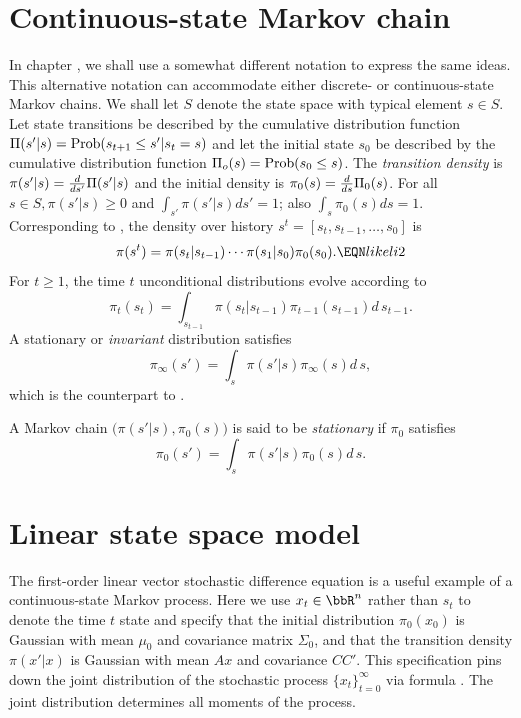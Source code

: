 \section{Continuous-state Markov chain}\label{sec:Markovcontstsp}%
In chapter , we shall  use a somewhat different
notation to express the same ideas. This alternative notation can
accommodate either discrete- or continuous-state Markov chains.  We
shall let $S$ denote the state space with typical element $s \in
S$.     Let state transitions be described by the cumulative distribution function
$\Pi(s' | s) =  {\rm
Prob} (s_{t+1} \leq  s' | s_t =s)$ and let the initial state $s_0$ be described by
 the cumulative distribution function $\Pi_o(s) =  {\rm
Prob} (s_0 \leq s)$.  The {\it transition density\/} is $\pi(s' | s )  =  {d \over d s'} \Pi(s'|s)$
and the initial density is %
$\pi_0(s) = {d \over d s} \Pi_0(s)$.  For all $s\in S, \pi(s'|s )
\geq 0$ and $  \int_{s'} \pi(s'|s) d s' =1$; also $\int_s \pi_0(s) d s
=1$.
Corresponding to , the  density
over  history $s^t = [s_t, s_{t-1}, \ldots, s_0]$
is
 $$ \pi(s^t) = \pi(s_t | s_{t-1} )\cdots \pi(s_1| s_0) \pi_0 (s_0).
  \EQN likeli2 $$
For $t\geq 1$, the time $t$ unconditional distributions
evolve according to
$$ \pi_t(s_t) = \int_{s_{t-1}} \pi(s_t|s_{t-1}) \pi_{t-1} (s_{t-1})
     d \, s_{t-1} .$$
A stationary or  {\it invariant\/} distribution
satisfies
$$ \pi_\infty(s') = \int_s \pi(s'|s) \pi_\infty (s) d \, s, $$
which is the counterpart to
.

\medskip
{} A Markov chain $\bigl(\pi(s'|s), \pi_0(s)\bigr)$ is said
to be {\it stationary\/} if $\pi_0$ satisfies
  $$ \pi_0(s') = \int_s \pi(s'|s) \pi_0 (s) d \, s. $$

%
\section{Linear state space model}\label{sec:stochlinear}%
   The first-order linear vector stochastic difference equation
is a  useful example of a continuous-state Markov process.
Here we  use
$x_t \in {\bbR}^n$   rather than $s_t$ to denote the time $t$ state
and
specify that the initial distribution   $\pi_0(x_0)$ is Gaussian with mean
$\mu_0$ and covariance matrix $\Sigma_0$, and that
the transition density $\pi(x'|x) $ is Gaussian with
mean $A x$ and covariance $C C'$.
This specification pins down the joint distribution of the
stochastic process $\{x_t\}_{t=0}^\infty$ via formula
.
The joint distribution determines
all  moments of the process.


